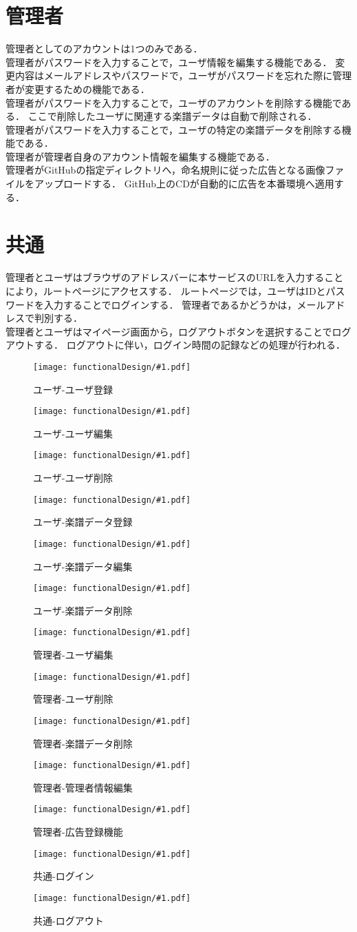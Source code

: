 \section{管理者}
管理者としてのアカウントは1つのみである．\\
管理者がパスワードを入力することで，ユーザ情報を編集する機能である．
変更内容はメールアドレスやパスワードで，ユーザがパスワードを忘れた際に管理者が変更するための機能である．\\
管理者がパスワードを入力することで，ユーザのアカウントを削除する機能である．
ここで削除したユーザに関連する楽譜データは自動で削除される．\\
管理者がパスワードを入力することで，ユーザの特定の楽譜データを削除する機能である．\\
管理者が管理者自身のアカウント情報を編集する機能である．\\
管理者がGitHubの指定ディレクトリへ，命名規則に従った広告となる画像ファイルをアップロードする．
GitHub上のCDが自動的に広告を本番環境へ適用する．
\section{共通}
管理者とユーザはブラウザのアドレスバーに本サービスのURLを入力することにより，ルートページにアクセスする．
ルートページでは，ユーザはIDとパスワードを入力することでログインする．
管理者であるかどうかは，メールアドレスで判別する．\\
管理者とユーザはマイページ画面から，ログアウトボタンを選択することでログアウトする．
ログアウトに伴い，ログイン時間の記録などの処理が行われる．
\newcommand{\icd}[2]{\begin{figure}[p]\centering\texttt{[image: functionalDesign/\#1.pdf]}\caption{#2}\label{#2}\end{figure}}
\icd{211-機能設計-利用者側-ユーザ登録}{ユーザ-ユーザ登録}
\icd{212-機能設計-利用者側-ユーザ編集}{ユーザ-ユーザ編集}
\icd{213-機能設計-利用者側-ユーザ削除}{ユーザ-ユーザ削除}
\icd{214-機能設計-利用者側-楽譜データ登録}{ユーザ-楽譜データ登録}
\icd{215-機能設計-利用者側-楽譜データ編集}{ユーザ-楽譜データ編集}
\icd{216-機能設計-利用者側-楽譜データ削除}{ユーザ-楽譜データ削除}
\icd{221-機能設計-管理者側-ユーザ編集}{管理者-ユーザ編集}
\icd{222-機能設計-管理者側-ユーザ削除}{管理者-ユーザ削除}
\icd{223-機能設計-管理者側-楽譜データ削除}{管理者-楽譜データ削除}
\icd{224-機能設計-管理者側-管理者情報編集機能}{管理者-管理者情報編集}
\icd{225-機能設計-管理者側-広告登録機能}{管理者-広告登録機能}
\icd{217-機能設計-利用者側-ログイン}{共通-ログイン}
\icd{218-機能設計-利用者側-ログアウト}{共通-ログアウト}
